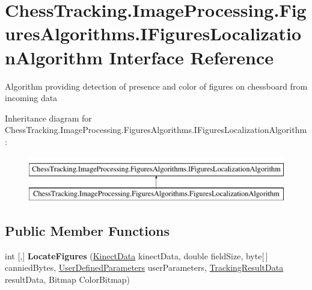 \hypertarget{interface_chess_tracking_1_1_image_processing_1_1_figures_algorithms_1_1_i_figures_localization_algorithm}{}\section{Chess\+Tracking.\+Image\+Processing.\+Figures\+Algorithms.\+I\+Figures\+Localization\+Algorithm Interface Reference}
\label{interface_chess_tracking_1_1_image_processing_1_1_figures_algorithms_1_1_i_figures_localization_algorithm}


Algorithm providing detection of presence and color of figures on chessboard from incoming data  


Inheritance diagram for Chess\+Tracking.\+Image\+Processing.\+Figures\+Algorithms.\+I\+Figures\+Localization\+Algorithm\+:\begin{figure}[H]
\begin{center}
\leavevmode
\includegraphics[height=2.000000cm]{interface_chess_tracking_1_1_image_processing_1_1_figures_algorithms_1_1_i_figures_localization_algorithm}
\end{center}
\end{figure}
\subsection*{Public Member Functions}
\begin{DoxyCompactItemize}
\item 
\mbox{\label{interface_chess_tracking_1_1_image_processing_1_1_figures_algorithms_1_1_i_figures_localization_algorithm_a3e8f908999d98d97cddd038567f5b311}} 
int \mbox{[},\mbox{]} {\bfseries Locate\+Figures} (\mbox{\hyperlink{class_chess_tracking_1_1_image_processing_1_1_pipeline_data_1_1_kinect_data}{Kinect\+Data}} kinect\+Data, double field\+Size, byte\mbox{[}$\,$\mbox{]} cannied\+Bytes, \mbox{\hyperlink{class_chess_tracking_1_1_image_processing_1_1_pipeline_data_1_1_user_defined_parameters}{User\+Defined\+Parameters}} user\+Parameters, \mbox{\hyperlink{class_chess_tracking_1_1_image_processing_1_1_pipeline_data_1_1_tracking_result_data}{Tracking\+Result\+Data}} result\+Data, Bitmap Color\+Bitmap)
\end{DoxyCompactItemize}
